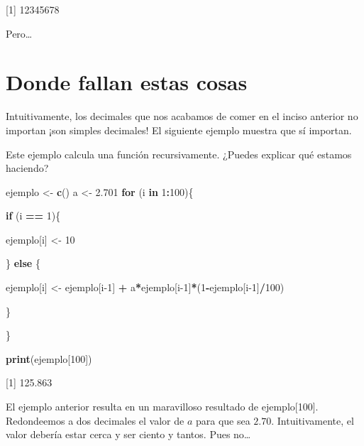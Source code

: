 \documentclass[
]{book}
\newenvironment{Shaded}{\begin{snugshade}}{\end{snugshade}}
\newcommand{\ControlFlowTok}[1]{\textcolor[rgb]{0.13,0.29,0.53}{\textbf{#1}}}
\newcommand{\DecValTok}[1]{\textcolor[rgb]{0.00,0.00,0.81}{#1}}
\newcommand{\FloatTok}[1]{\textcolor[rgb]{0.00,0.00,0.81}{#1}}
\newcommand{\KeywordTok}[1]{\textcolor[rgb]{0.13,0.29,0.53}{\textbf{#1}}}
\newcommand{\NormalTok}[1]{#1}
\newcommand{\OperatorTok}[1]{\textcolor[rgb]{0.81,0.36,0.00}{\textbf{#1}}}
\newcommand{\StringTok}[1]{\textcolor[rgb]{0.31,0.60,0.02}{#1}}
\begin{document}
{[}1{]} 12345678

Pero\ldots{}

\hypertarget{donde-fallan-estas-cosas}{%
\section{Donde fallan estas cosas}\label{donde-fallan-estas-cosas}}

Intuitivamente, los decimales que nos acabamos de comer en el inciso anterior no importan ¡son simples decimales! El siguiente ejemplo muestra que sí importan.

Este ejemplo calcula una función recursivamente. ¿Puedes explicar qué estamos haciendo?

\begin{Shaded}
\begin{Highlighting}[]
\NormalTok{ejemplo <-}\StringTok{ }\KeywordTok{c}\NormalTok{()}
\NormalTok{a       <-}\StringTok{ }\FloatTok{2.701}
\ControlFlowTok{for}\NormalTok{ (i }\ControlFlowTok{in} \DecValTok{1}\OperatorTok{:}\DecValTok{100}\NormalTok{)\{}
  
  \ControlFlowTok{if}\NormalTok{ (i }\OperatorTok{==}\StringTok{ }\DecValTok{1}\NormalTok{)\{}
    
\NormalTok{    ejemplo[i] <-}\StringTok{ }\DecValTok{10}
    
\NormalTok{  \} }\ControlFlowTok{else}\NormalTok{ \{}
    
\NormalTok{    ejemplo[i] <-}\StringTok{ }\NormalTok{ejemplo[i}\DecValTok{-1}\NormalTok{] }\OperatorTok{+}\StringTok{ }
\StringTok{                  }\NormalTok{a}\OperatorTok{*}\NormalTok{ejemplo[i}\DecValTok{-1}\NormalTok{]}\OperatorTok{*}\NormalTok{(}\DecValTok{1}\OperatorTok{-}\NormalTok{ejemplo[i}\DecValTok{-1}\NormalTok{]}\OperatorTok{/}\DecValTok{100}\NormalTok{)}
    
\NormalTok{  \}}
  
\NormalTok{\}}
 
\KeywordTok{print}\NormalTok{(ejemplo[}\DecValTok{100}\NormalTok{])}
\end{Highlighting}
\end{Shaded}

{[}1{]} 125.863

El ejemplo anterior resulta en un maravilloso resultado de ejemplo{[}100{]}. Redondeemos a dos decimales el valor de \(a\) para que sea \(2.70\). Intuitivamente, el valor debería estar cerca y ser ciento y tantos. Pues no\ldots{}
\end{document}
